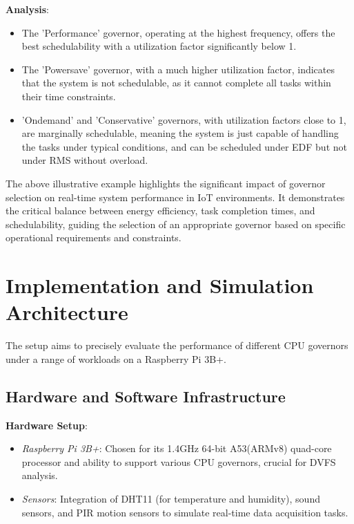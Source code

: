 \documentclass[conference]{IEEEtran}
\begin{document}
\textbf{Analysis}:
\begin{itemize}
    \item The 'Performance' governor, operating at the highest frequency, offers the best schedulability with a utilization factor significantly below 1.
    \item The 'Powersave' governor, with a much higher utilization factor, indicates that the system is not schedulable, as it cannot complete all tasks within their time constraints.
    \item 'Ondemand' and 'Conservative' governors, with utilization factors close to 1, are marginally schedulable, meaning the system is just capable of handling the tasks under typical conditions, and can be scheduled under EDF but not under RMS without overload.
\end{itemize}

The above illustrative example highlights the significant impact of governor selection on real-time system performance in IoT environments. It demonstrates the critical balance between energy efficiency, task completion times, and schedulability, guiding the selection of an appropriate governor based on specific operational requirements and constraints.

\section{Implementation and Simulation Architecture}
The setup aims to precisely evaluate the performance of different CPU governors under a range of workloads on a Raspberry Pi 3B+.

\subsection{Hardware and Software Infrastructure}
\textbf{Hardware Setup}:
\begin{itemize}
    \item \textit{Raspberry Pi 3B+}: Chosen for its 1.4GHz 64-bit A53(ARMv8) quad-core processor and ability to support various CPU governors, crucial for DVFS analysis.
    \item \textit{Sensors}: Integration of DHT11 (for temperature and humidity), sound sensors, and PIR motion sensors to simulate real-time data acquisition tasks.
\end{itemize}
\end{document}

